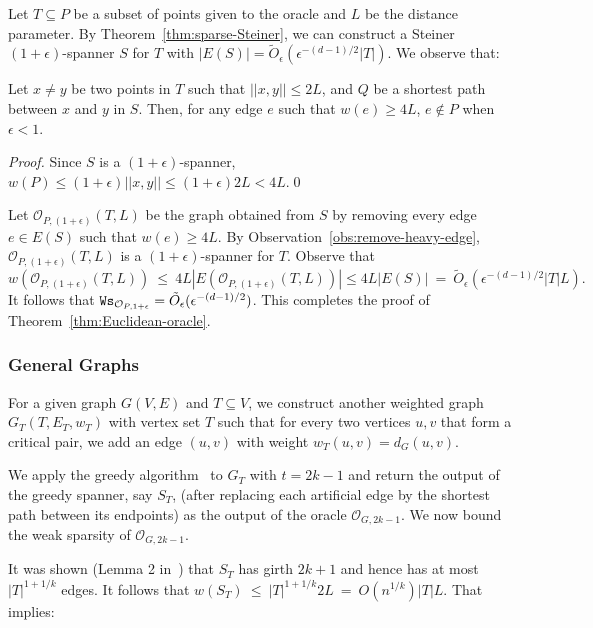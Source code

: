 Let $T\subseteq P$ be a subset of points given to the oracle and $L$ be the distance parameter. By Theorem~\ref{thm:sparse-Steiner}, we can construct a Steiner $(1+\epsilon)$-spanner $S$ for $T$ with $|E(S)| = \tilde{O}_{\epsilon}(\epsilon^{-(d-1)/2} |T|)$. We observe that:

\begin{observation}\label{obs:remove-heavy-edge} Let $x\not= y$ be two points in $T$ such that $||x,y||\leq 2L$, and $Q$ be a shortest path between $x$ and $y$ in $S$. Then, for any edge $e$ such that $w(e)\geq 4L$, $e\not\in P$ when $\epsilon < 1$.
\end{observation}
\begin{proof}
	Since $S$ is a $(1+\epsilon)$-spanner, $w(P)\leq (1+\epsilon)||x,y|| \leq (1+\epsilon)2 L < 4L$.\qed
\end{proof}
Let $\mathcal{O}_{P,(1+\epsilon)}(T,L)$ be the graph obtained from $S$ by removing every edge $e\in E(S)$ such that $w(e)\geq 4L$. By Observation~\ref{obs:remove-heavy-edge}, $\mathcal{O}_{P,(1+\epsilon)}(T,L)$ is a $(1+\epsilon)$-spanner for $T$. Observe that $$w(\mathcal{O}_{P,(1+\epsilon)}(T,L))~\leq~ 4L |E(\mathcal{O}_{P,(1+\epsilon)}(T,L))| \leq 4L |E(S)| ~=~ \tilde{O}_{\epsilon}(\epsilon^{-(d-1)/2} |T| L).$$ It follows that $\mathtt{Ws}_{\mathcal{O}_{P,1+\epsilon}} = \tilde{O}_{\epsilon}(\epsilon^{-(d-1)/2})$. This completes the proof of Theorem~\ref{thm:Euclidean-oracle}.

\subsubsection{General Graphs}\label{subsec:general}

For a given graph $G(V,E)$ and $T\subseteq V$, we construct another weighted graph $G_T(T, E_T,w_T)$ with vertex set $T$ such that for every two vertices $u,v$ that form a critical pair, we add an edge $(u,v)$ with weight $w_T(u,v) = d_G(u,v)$.

We apply the greedy algorithm~\cite{ADDJS93} to $G_T$ with $t = 2k-1$ and return the output of the greedy spanner, say $S_T$, (after replacing each artificial edge by the shortest path between its endpoints) as the output of the oracle $\mathcal{O}_{G,2k-1}$.  We now bound the weak sparsity of $\mathcal{O}_{G,2k-1}$.

It was shown (Lemma 2 in~\cite{ADDJS93}) that $S_T$ has girth $2k+1$ and hence has at most $|T|^{1+1/k}$ edges.  It follows that $w(S_T) ~\leq~ |T|^{1+1/k}2L ~=~ O(n^{1/k})|T|L$. That implies:

